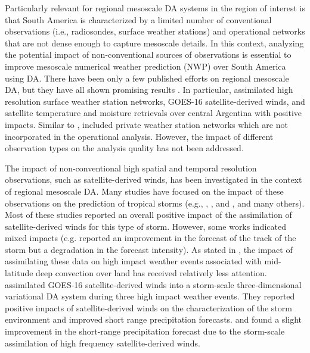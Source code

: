 \documentclass[final,5p,times,twocolumn,authoryear]{elsarticle} %
\begin{document}
Particularly relevant for regional mesoscale DA systems in the region of interest is that South America is characterized by a limited number of conventional observations (i.e., radiosondes, surface weather stations) and operational networks that are not dense enough to capture mesoscale details. In this context, analyzing the potential impact of non-conventional sources of observations is essential to improve mesoscale numerical weather prediction (NWP) over South America using DA. There have been only a few published efforts on regional mesoscale DA, but they have all shown promising results \citep[e.g.][]{dillon2016, dillon2021, goncalvesdegoncalves2015}. In particular, \citet{dillon2021} assimilated high resolution surface weather station networks, GOES-16 satellite-derived winds, and satellite temperature and moisture retrievals over central Argentina with positive impacts. Similar to \citet{gasperoni2018}, \citet{dillon2021} included private weather station networks which are not incorporated in the operational analysis. However, the impact of different observation types on the analysis quality has not been addressed.

The impact of non-conventional high spatial and temporal resolution observations, such as satellite-derived winds, has been investigated in the context of regional mesoscale DA. Many studies have focused on the impact of these observations on the prediction of tropical storms (e.g., \citet{wu2014}, \citet{cherubini2006}, and \citet{sawada2019}, and many others). Most of these studies reported an overall positive impact of the assimilation of satellite-derived winds for this type of storm. However, some works indicated mixed impacts (e.g. \citet{sawada2019} reported an improvement in the forecast of the track of the storm but a degradation in the forecast intensity). As stated in \citet{zhao2021, zhao2021a}, the impact of assimilating these data on high impact weather events associated with mid-latitude deep convection over land has received relatively less attention. \citet{zhao2021, zhao2021a} assimilated GOES-16 satellite-derived winds into a storm-scale three-dimensional variational DA system during three high impact weather events. They reported positive impacts of satellite-derived winds on the characterization of the storm environment and improved short range precipitation forecasts. \citet{otsuka2015} and \citet{mallick2020} found a slight improvement in the short-range precipitation forecast due to the storm-scale assimilation of high frequency satellite-derived winds.
\end{document}

